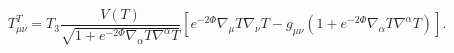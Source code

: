 \begin{equation}\label{etmnt}
T^{T}_{\mu\nu}=T_{3}
\frac{V(T)}{\sqrt{1+e^{-2\Phi}\nabla_\alpha T\nabla^\alpha T}}
\left[ e^{-2\Phi}\nabla_\mu T\nabla_\nu T
-g_{\mu\nu}(1+e^{-2\Phi}\nabla_\alpha T\nabla^\alpha T)
\right].
\end{equation}

